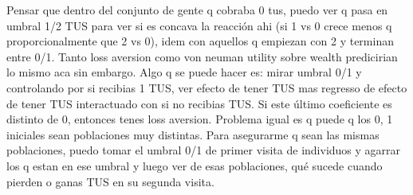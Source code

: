 \documentclass[12pt]{article}
\begin{document}
Pensar que dentro del conjunto de gente q cobraba 0 tus, puedo ver q pasa en umbral 1/2 TUS para ver si es concava la reacción ahi (si 1 vs 0 crece menos q proporcionalmente que 2 vs 0), idem con aquellos q empiezan con 2 y terminan entre 0/1. Tanto loss aversion como von neuman utility sobre wealth predicirian lo mismo aca sin embargo.
Algo q se puede hacer es: mirar umbral 0/1 y controlando por si recibias 1 TUS, ver efecto de tener TUS mas regresso de efecto de tener TUS interactuado con si no recibias TUS. Si este último coeficiente es distinto de 0, entonces tenes loss aversion. Problema igual es q puede q los 0, 1 iniciales sean poblaciones muy distintas. Para asegurarme q sean las mismas poblaciones, puedo tomar el umbral 0/1 de primer visita de individuos y agarrar los q estan en ese umbral y luego ver de esas poblaciones, qué sucede cuando pierden o ganas TUS en su segunda visita.



\end{document}
